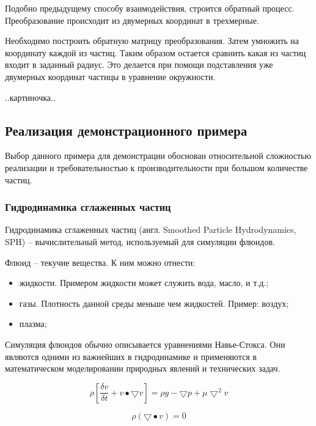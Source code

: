 Подобно предыдущему способу взаимодействия, строится обратный процесс. 
Преобразование происходит из двумерных координат в трехмерные.

Необходимо построить обратную матрицу преобразования.
Затем умножить на координату каждой из частиц. Таким образом остается сравнить 
какая из частиц входит в заданный радиус. Это делается при помощи подставления уже 
двумерных координат частицы в уравнение окружности.

..картиночка..

\subsection{Реализация демонстрационного примера}

Выбор данного примера для демонстрации обоснован относительной сложностью реализации
и требовательностью к производительности при большом количестве частиц.

\subsubsection{Гидродинамика сглаженных частиц}

Гидродинамика сглаженных частиц (англ. Smoothed Particle Hydrodynamics, SPH) -- вычислительный 
метод, используемый для симуляции флюидов.

Флюид -- текучие вещества. К ним можно отнести:
\begin{itemize}
  \item жидкости. Примером жидкости может служить вода, масло, и т.д.;
  \item газы. Плотность данной среды меньше чем жидкостей. Пример: воздух;
  \item плазма;
\end{itemize}

Симуляция флюидов обычно описывается уравнениями Навье-Стокса.
Они являются одними из важнейших в гидродинамике и применяются в математическом
моделировании природных явлений и технических задач.

\begin{equation}
\label{eq:nve1}
  \rho[\frac{\delta{}v}{\delta{}t} + v \bullet \bigtriangledown{}v] = \rho{}g - \bigtriangledown{}p + \mu{}\bigtriangledown^2v
\end{equation}

\begin{equation}
\label{eq:massCont}
  \rho(\bigtriangledown\bullet{}v) = 0
\end{equation}

